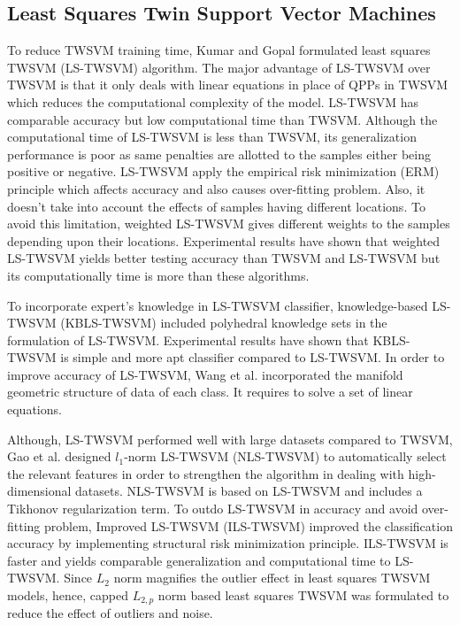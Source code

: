 \documentclass[pdflatex,sn-mathphys]{sn-jnl}%
\theoremstyle{thmstyleone}%
\theoremstyle{thmstyletwo}%
\theoremstyle{thmstylethree}%
\begin{document}
\subsection{Least Squares Twin Support Vector Machines}
\noindent
\newline
To reduce TWSVM training time, Kumar and Gopal \cite{kumar2009least} formulated least squares TWSVM (LS-TWSVM) algorithm. The major advantage of LS-TWSVM over TWSVM is that it only deals with linear equations in place of QPPs in TWSVM which reduces the computational complexity of the model. LS-TWSVM has comparable accuracy but low computational time than TWSVM. Although the computational time of LS-TWSVM is less than TWSVM, its generalization performance is poor as same penalties are allotted to the samples either being positive or negative. LS-TWSVM apply the empirical risk minimization (ERM) principle which affects accuracy and also causes over-fitting problem. Also, it doesn't take into account the effects of samples having different locations. To avoid this limitation,  weighted LS-TWSVM  \cite{xu2014weighted} gives different weights to the samples depending upon their locations. Experimental results have shown that weighted LS-TWSVM yields better testing accuracy than TWSVM and LS-TWSVM but its computationally time is more than these algorithms.

To incorporate expert's knowledge in LS-TWSVM classifier, knowledge-based LS-TWSVM (KBLS-TWSVM) \cite{kumar2010knowledge}  included polyhedral knowledge sets in the formulation of LS-TWSVM. Experimental results have shown that KBLS-TWSVM is simple and more apt classifier compared to LS-TWSVM. In order to improve accuracy of LS-TWSVM, Wang et al. \cite{wang2010localized} incorporated the manifold geometric structure of data of each class. It requires to solve a set of linear equations. 

Although, LS-TWSVM performed well with large datasets compared to TWSVM, Gao et al. \cite{gao20111} designed $l_1$-norm LS-TWSVM (NLS-TWSVM) to automatically select the relevant features in order to strengthen the algorithm in dealing with high-dimensional datasets. NLS-TWSVM is based on LS-TWSVM and includes a Tikhonov regularization term. To outdo LS-TWSVM in accuracy and avoid over-fitting problem, Improved LS-TWSVM (ILS-TWSVM)  \cite{xu2012improved} improved the classification accuracy by implementing structural risk minimization principle. ILS-TWSVM is faster and yields comparable generalization and computational time to LS-TWSVM. Since $L_2$ norm magnifies the outlier effect in least squares TWSVM models, hence, capped $L_{2,p}$ norm based least squares TWSVM \cite{yuan2021capped} was formulated to reduce the effect of outliers and noise.
\end{document}

